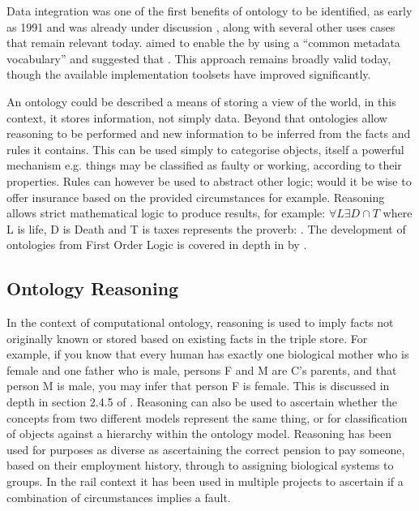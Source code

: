 Data integration was one of the first benefits of ontology to be identified, as early as 1991 and was already under discussion \citep{Siegel1991}, along with several other uses cases that remain relevant today. \citet{Siegel1991} aimed to enable the  by using a ``common metadata vocabulary'' and suggested that . This approach remains broadly valid today, though the available implementation toolsets have improved significantly. 

An ontology could be described a means of storing a view of the world, in this context, it stores information, not simply data. Beyond that ontologies allow reasoning to be performed and new information to be inferred from the facts and rules it contains. This can be used simply to categorise objects, itself a powerful mechanism e.g. things may be classified as faulty or working, according to their properties. Rules can however be used to abstract other logic; would it be wise to offer insurance based on the provided circumstances for example. Reasoning allows strict mathematical logic to produce results, for example: \(\forall L \exists D \cap T \) where L is life, D is Death and T is taxes represents the proverb: . The development of ontologies from First Order Logic is covered in depth in by \citet{baader_calvanese_mcguinness_nardi_patel-schneider_2007}.

\subsection{Ontology Reasoning}
In the context of computational ontology, reasoning is used to imply facts not originally known or stored based on existing facts in the triple store. For example, if you know that every human has exactly one biological mother who is female and one father who is male, persons F and M are C's parents, and that person M is male, you may infer that person F is female.  This is discussed in depth in section 2.4.5 of \citet{Tutcher2015}. Reasoning can also be used to ascertain whether the concepts from two different models represent the same thing, or for classification of objects against a hierarchy within the ontology model. Reasoning has been used for purposes as diverse as ascertaining the correct pension to pay someone, based on their employment history, through to assigning biological systems to groups. In the rail context it has been used in multiple projects to ascertain if a combination of circumstances implies a fault.

